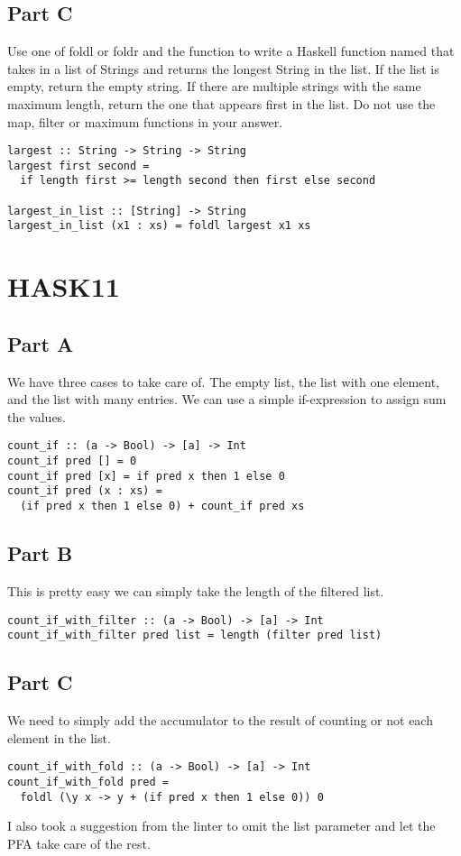 \subsection*{Part C}
Use one of foldl or foldr and the  function
to write a Haskell function named \linebreak{} that takes
in a list of Strings and returns the longest String in the list. If the
list is empty, return the empty string. If there are multiple strings
with the same maximum length, return the one that appears first in the
list. Do not use the map, filter or maximum functions in your answer.
\begin{verbatim}
largest :: String -> String -> String
largest first second =
  if length first >= length second then first else second

largest_in_list :: [String] -> String
largest_in_list (x1 : xs) = foldl largest x1 xs
\end{verbatim}

\section*{HASK11}
\subsection*{Part A}
We have three cases to take care of. The empty list, the list with one
element, and the list with many entries. We can use a simple
if-expression to assign sum the values.
\begin{verbatim}
count_if :: (a -> Bool) -> [a] -> Int
count_if pred [] = 0
count_if pred [x] = if pred x then 1 else 0
count_if pred (x : xs) = 
  (if pred x then 1 else 0) + count_if pred xs
\end{verbatim}

\subsection*{Part B}
This is pretty easy we can simply take the length of the filtered list.
\begin{verbatim}
count_if_with_filter :: (a -> Bool) -> [a] -> Int
count_if_with_filter pred list = length (filter pred list)
\end{verbatim}

\subsection*{Part C}
We need to simply add the accumulator to the result of counting or not
each element in the list.
\begin{verbatim}
count_if_with_fold :: (a -> Bool) -> [a] -> Int
count_if_with_fold pred =
  foldl (\y x -> y + (if pred x then 1 else 0)) 0
\end{verbatim}
I also took a suggestion from the linter to omit the list parameter and
let the PFA take care of the rest.

